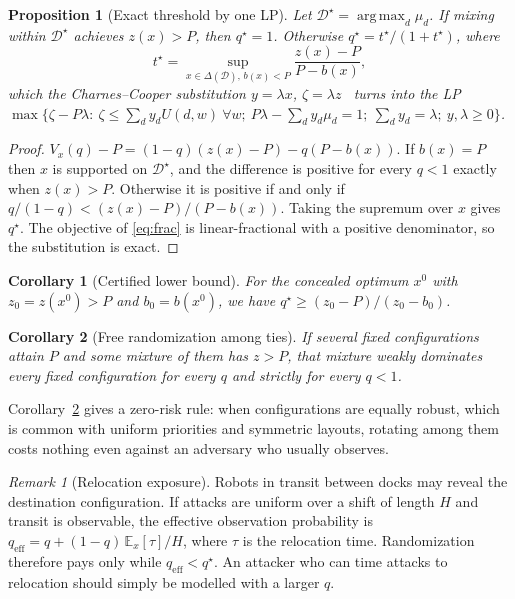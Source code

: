 \documentclass[10pt,twocolumn,letterpaper]{article}
\newtheorem{proposition}{Proposition}
\newtheorem{corollary}{Corollary}
\theoremstyle{remark}
\newtheorem{remark}{Remark}
\newcommand{\D}{\mathcal{D}}
\DeclareMathOperator*{\argmax}{arg\,max}
\begin{document}
\begin{proposition}[Exact threshold by one LP]\label{prop:qstar}
Let $\D^\star=\argmax_d\mu_d$. If mixing within $\D^\star$ achieves $z(x)>P$, then $q^\star=1$. Otherwise $q^\star=t^\star/(1+t^\star)$, where
\begin{equation}\label{eq:frac}
t^\star=\sup_{x\in\Delta(\D),\,b(x)<P}\frac{z(x)-P}{P-b(x)},
\end{equation}
which the Charnes--Cooper substitution $y=\lambda x$, $\zeta=\lambda z$~\cite{charnes1962} turns into the LP
$\max\{\zeta-P\lambda:\ \zeta\le\textstyle\sum_d y_dU(d,w)\ \forall w;\ P\lambda-\sum_d y_d\mu_d=1;\ \sum_dy_d=\lambda;\ y,\lambda\ge0\}$.
\end{proposition}
\begin{proof}
$V_x(q)-P=(1-q)(z(x)-P)-q(P-b(x))$. If $b(x)=P$ then $x$ is supported on $\D^\star$, and the difference is positive for every $q<1$ exactly when $z(x)>P$. Otherwise it is positive if and only if $q/(1-q)<(z(x)-P)/(P-b(x))$. Taking the supremum over $x$ gives $q^\star$. The objective of \eqref{eq:frac} is linear-fractional with a positive denominator, so the substitution is exact.
\end{proof}

\begin{corollary}[Certified lower bound]\label{cor:lb}
For the concealed optimum $x^0$ with $z_0=z(x^0)>P$ and $b_0=b(x^0)$, we have $q^\star\ge (z_0-P)/(z_0-b_0)$.
\end{corollary}

\begin{corollary}[Free randomization among ties]\label{cor:ties}
If several fixed configurations attain $P$ and some mixture of them has $z>P$, that mixture weakly dominates every fixed configuration for every $q$ and strictly for every $q<1$.
\end{corollary}
Corollary~\ref{cor:ties} gives a zero-risk rule: when configurations are equally robust, which is common with uniform priorities and symmetric layouts, rotating among them costs nothing even against an adversary who usually observes.

\begin{remark}[Relocation exposure]\label{rem:reloc}
Robots in transit between docks may reveal the destination configuration. If attacks are uniform over a shift of length $H$ and transit is observable, the effective observation probability is $q_{\mathrm{eff}}=q+(1-q)\,\mathbb{E}_x[\tau]/H$, where $\tau$ is the relocation time. Randomization therefore pays only while $q_{\mathrm{eff}}<q^\star$. An attacker who can time attacks to relocation should simply be modelled with a larger $q$.
\end{remark}
\end{document}

